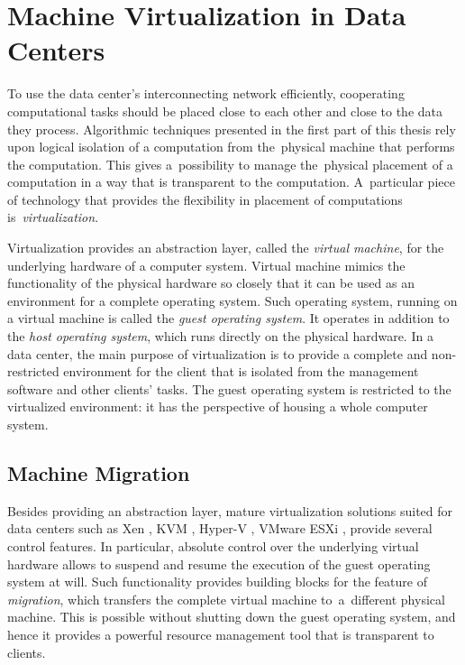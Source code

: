 \section{Machine Virtualization in Data Centers}
\label{sec:intro-machine-virtualization}

To use the data center's interconnecting network efficiently, cooperating computational tasks should be placed close to each other and close to the data they process.
Algorithmic techniques presented in the first part of this thesis rely upon logical isolation of a computation from the~physical machine that performs the computation.
This gives a~possibility to manage the~physical placement of a computation in a way that is transparent to the computation.
A~particular piece of technology that provides the flexibility in placement of computations is~\emph{virtualization}.

Virtualization provides an abstraction layer, called the \emph{virtual machine}, for the underlying hardware of a computer system.
Virtual machine mimics the functionality of the physical hardware so closely that it can be used as an environment for a complete operating system.
Such operating system, running on a virtual machine is called the \emph{guest
operating system}. It operates in addition to the \emph{host operating
system}, which runs directly on the physical hardware. 
In a data center, the main purpose of virtualization is to provide a complete and non-restricted environment for the client that is isolated from the management software and other clients' tasks.
The guest operating system is restricted to the virtualized environment: it has the perspective of housing a whole computer system.


\subsection{Machine Migration}

Besides providing an abstraction layer, mature virtualization solutions suited for data centers such as Xen
\cite{url-xen}, KVM \cite{url-kvm}, Hyper-V \cite{url-hyperv}, VMware ESXi
\cite{url-vmware}, provide several control features.
In particular, absolute control over the underlying virtual hardware allows to suspend and resume the execution of the guest operating system at will.
Such functionality provides building blocks for the feature of \emph{migration}, which transfers the complete virtual machine to~a~different physical machine.
This is possible without shutting down the guest operating system, and hence it provides a powerful resource management tool that is transparent to clients.

